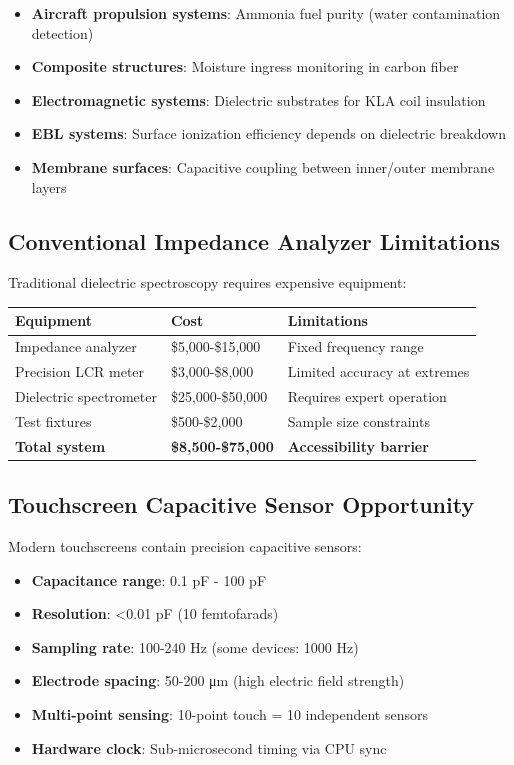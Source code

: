 \documentclass[12pt,a4paper]{article}
\begin{document}
\begin{itemize}
\item \textbf{Aircraft propulsion systems}: Ammonia fuel purity (water contamination detection)
\item \textbf{Composite structures}: Moisture ingress monitoring in carbon fiber
\item \textbf{Electromagnetic systems}: Dielectric substrates for KLA coil insulation
\item \textbf{EBL systems}: Surface ionization efficiency depends on dielectric breakdown
\item \textbf{Membrane surfaces}: Capacitive coupling between inner/outer membrane layers
\end{itemize}

\subsection{Conventional Impedance Analyzer Limitations}

Traditional dielectric spectroscopy requires expensive equipment:

\begin{center}
\begin{tabular}{|l|l|l|}
\hline
\textbf{Equipment} & \textbf{Cost} & \textbf{Limitations} \\
\hline
Impedance analyzer & \$5,000-\$15,000 & Fixed frequency range \\
Precision LCR meter & \$3,000-\$8,000 & Limited accuracy at extremes \\
Dielectric spectrometer & \$25,000-\$50,000 & Requires expert operation \\
Test fixtures & \$500-\$2,000 & Sample size constraints \\
\hline
\textbf{Total system} & \textbf{\$8,500-\$75,000} & \textbf{Accessibility barrier} \\
\hline
\end{tabular}
\end{center}

\subsection{Touchscreen Capacitive Sensor Opportunity}

Modern touchscreens contain precision capacitive sensors:

\begin{itemize}
\item \textbf{Capacitance range}: 0.1 pF - 100 pF
\item \textbf{Resolution}: <0.01 pF (10 femtofarads)
\item \textbf{Sampling rate}: 100-240 Hz (some devices: 1000 Hz)
\item \textbf{Electrode spacing}: 50-200 μm (high electric field strength)
\item \textbf{Multi-point sensing}: 10-point touch = 10 independent sensors
\item \textbf{Hardware clock}: Sub-microsecond timing via CPU sync
\end{itemize}
\end{document}
